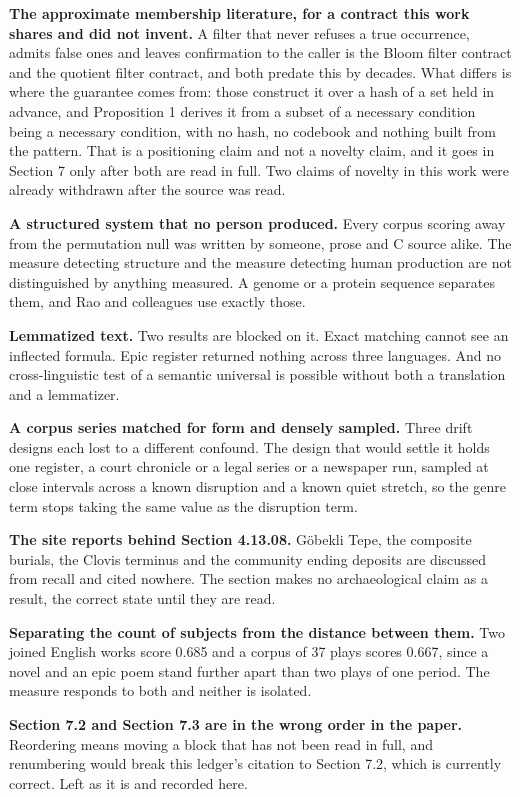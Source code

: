 \textbf{The approximate membership literature, for a contract this work shares and did not invent.} A filter that never refuses a true occurrence, admits false ones and leaves confirmation to the caller is the Bloom filter contract and the quotient filter contract, and both predate this by decades. What differs is where the guarantee comes from: those construct it over a hash of a set held in advance, and Proposition 1 derives it from a subset of a necessary condition being a necessary condition, with no hash, no codebook and nothing built from the pattern. That is a positioning claim and not a novelty claim, and it goes in Section 7 only after both are read in full. Two claims of novelty in this work were already withdrawn after the source was read.

\textbf{A structured system that no person produced.} Every corpus scoring away from the permutation null was written by someone, prose and C source alike. The measure detecting structure and the measure detecting human production are not distinguished by anything measured. A genome or a protein sequence separates them, and Rao and colleagues use exactly those.

\textbf{Lemmatized text.} Two results are blocked on it. Exact matching cannot see an inflected formula. Epic register returned nothing across three languages. And no cross-linguistic test of a semantic universal is possible without both a translation and a lemmatizer.

\textbf{A corpus series matched for form and densely sampled.} Three drift designs each lost to a different confound. The design that would settle it holds one register, a court chronicle or a legal series or a newspaper run, sampled at close intervals across a known disruption and a known quiet stretch, so the genre term stops taking the same value as the disruption term.

\textbf{The site reports behind Section 4.13.08.} Göbekli Tepe, the composite burials, the Clovis terminus and the community ending deposits are discussed from recall and cited nowhere. The section makes no archaeological claim as a result, the correct state until they are read.

\textbf{Separating the count of subjects from the distance between them.} Two joined English works score 0.685 and a corpus of 37 plays scores 0.667, since a novel and an epic poem stand further apart than two plays of one period. The measure responds to both and neither is isolated.

\textbf{Section 7.2 and Section 7.3 are in the wrong order in the paper.} Reordering means moving a block that has not been read in full, and renumbering would break this ledger's citation to Section 7.2, which is currently correct. Left as it is and recorded here.

